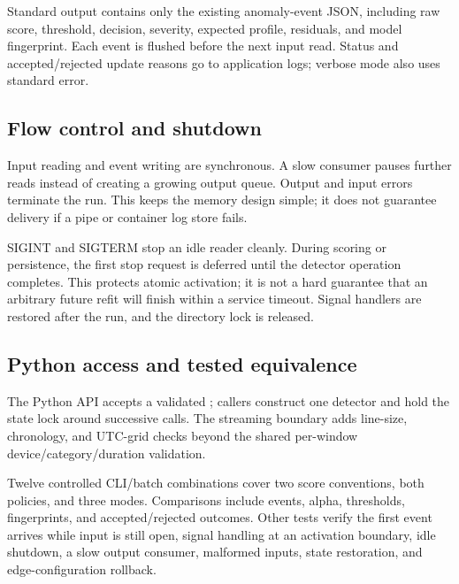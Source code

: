 Standard output contains only the existing anomaly-event JSON, including raw
score, threshold, decision, severity, expected profile, residuals, and model
fingerprint. Each event is flushed before the next input read. Status and
accepted/rejected update reasons go to application logs; verbose mode also
uses standard error.

\subsection{Flow control and shutdown}

Input reading and event writing are synchronous. A slow consumer pauses further
reads instead of creating a growing output queue. Output and input errors
terminate the run. This keeps the memory design simple; it does not guarantee
delivery if a pipe or container log store fails.

SIGINT and SIGTERM stop an idle reader cleanly. During scoring or persistence,
the first stop request is deferred until the detector operation completes.
This protects atomic activation; it is not a hard guarantee that an arbitrary
future refit will finish within a service timeout. Signal handlers are restored
after the run, and the directory lock is released.

\subsection{Python access and tested equivalence}

The Python API accepts a validated ; callers construct one
detector and hold the state lock around successive calls. The streaming
boundary adds line-size, chronology, and UTC-grid checks beyond the shared
per-window device/category/duration validation.

Twelve controlled CLI/batch combinations cover two score conventions, both
policies, and three modes. Comparisons include events, alpha, thresholds,
fingerprints, and accepted/rejected outcomes. Other tests verify the first
event arrives while input is still open, signal handling at an activation
boundary, idle shutdown, a slow output consumer, malformed inputs, state
restoration, and edge-configuration rollback.
